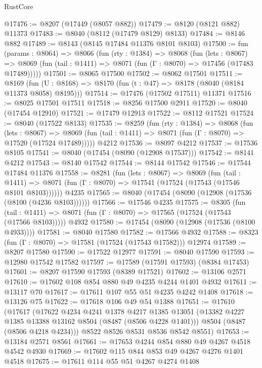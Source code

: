 \begin{lexlean}{RustCore}
\begin{coremodule}
@17476 := @8207 (@17449 (@8057 @882))
@17479 := @8120 (@8121 @882) @11373
@17483 := @8040 (@8112 (@17479 @8129) @8133)
@17484 := @8146 @882
@17489 := @8143 (@8145 @17484 @11376 @8101 @8103)
@17500 := fun (params : @8064) =>
  @8066
    (fun (rty : @1384) =>
    @8068
      (fun (lets : @8067) =>
      @8069 (fun (tail : @1411) => @8071 (fun (Γ : @8070) => @17456 (@17483 @17489)))))
@17501 := @8065 @17500
@17502 := @8062 @17501
@17511 := @8169
    (fun (U : @8168) => @8170 (fun (t : @47) => @8178 (@8040 (@8184 @11373 @8058) @8195)))
@17514 := @17476 (@17502 @17511) @11371
@17516 := @8025 @17501 @17511
@17518 := @8256 @17500 @2911
@17520 := @8040 (@17454 @12910)
@17521 := @17479 @12913
@17522 := @8112 @17521
@17524 := @8040 (@17522 @8133)
@17535 := @8259
    (fun (rty : @1384) =>
    @8068
      (fun (lets : @8067) =>
      @8069 (fun (tail : @1411) => @8071 (fun (Γ : @8070) => @17520 (@17524 @17489)))))
    @4212
@17536 := @8097 @4212
@17537 := @17536 @8105
@17541 := @8040 (@17454 (@8090 (@12908 @17537)))
@17542 := @8141 @4212
@17543 := @8140 @17542
@17544 := @8144 @17542
@17546 := @17544 @17484 @11376
@17558 := @8281
    (fun (lets : @8067) =>
    @8069
      (fun (tail : @1411) =>
      @8071 (fun (Γ : @8070) => @17541 (@17524 (@17543 (@17546 @8101 @8103))))))
    @4235
@17565 := @8040 (@17454 (@8090 (@12908 (@17536 (@8100 (@4236 @8103))))))
@17566 := @17546 @4235
@17575 := @8305
    (fun (tail : @1411) => @8071 (fun (Γ : @8070) => @17565 (@17524 (@17543 (@17566 @8103)))))
    @4932
@17580 := @17454 (@8090 (@12908 (@17536 (@8100 @4933))))
@17581 := @8040 @17580
@17582 := @17566 @4932
@17588 := @8323 (fun (Γ : @8070) => @17581 (@17524 (@17543 @17582))) @12974
@17589 := @8207 @17580
@17590 := @17522 @12977
@17591 := @8040 @17590
@17593 := @12980 @17542 @17582
@17597 := @17589 (@17591 @17593) (@8384 @17453)
@17601 := @8207 @17590 @17593 (@8389 @17521)
@17602 := @13106 @2571
@17610 := @17602 @108 @854 @880 @49 @4235 @4244 @1401 @4932
@17611 := @13117 @70
@17617 := @17611 @107 @55 @51 @4235 @4242 @1408
@17618 := @13126 @75
@17622 := @17618 @106 @49 @54 @1388
@17651 := @17610
    (@17617
      (@17622
        @4234
        @4241
        @1378
        @4217
        @1385
        @13051
        (@13382 @4227 @1385 @13388 @13162 @8504 (@8487 (@8506 @4228 @1401)))
        @8504
        (@8487 (@8506 @4218 @4234)))
      @8522
      @8526
      @8531
      @8536
      @8542
      @8551)
@17653 := @13184 @2571 @8561
@17661 := @17653 @4244 @854 @880 @49 @4267 @4518 @4542 @4930
@17669 := @17602 @115 @844 @853 @49 @4267 @4276 @1401 @4518
@17675 := @17611 @114 @55 @51 @4267 @4274 @1408

\end{coremodule}
\end{lexlean}

